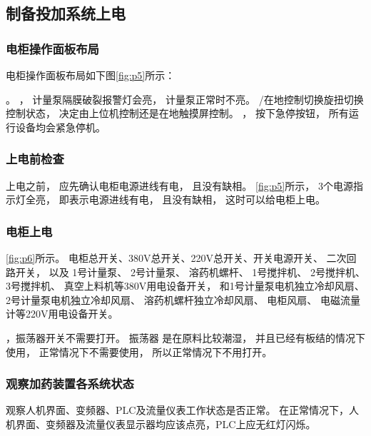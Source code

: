 \newpage %

   \subsection{制备投加系统上电}
        \subsubsection{电柜操作面板布局}
        电柜操作面板布局如下图\ref*{fig:p5}所示：

        

        。
        ，
        计量泵隔膜破裂报警灯会亮，
        计量泵正常时不亮。
        /在地控制切换旋扭切换控制状态，
        决定由上位机控制还是在地触摸屏控制。
        ，
        按下急停按钮，
        所有运行设备均会紧急停机。

      \subsubsection{上电前检查}
         上电之前，
         应先确认电柜电源进线有电，
         且没有缺相。
      \ref{fig:p5}所示，
      3个电源指示灯全亮，
      即表示电源进线有电，
      且没有缺相，
      这时可以给电柜上电。

      \newpage %

      \subsubsection{电柜上电}\label{sec:power-on}
        

      \ref{fig:p6}所示。
      电柜总开关、380V总开关、220V总开关、开关电源开关、
      二次回路开关，
      以及
      1号计量泵、
      2号计量泵、
      溶药机螺杆、
      1号搅拌机、
      2号搅拌机、
      3号搅拌机、
      真空上料机等380V用电设备开关，
      和1号计量泵电机独立冷却风扇、
      2号计量泵电机独立冷却风扇、
      溶药机螺杆独立冷却风扇、
      电柜风扇、
      电磁流量计等220V用电设备开关。

      ，振荡器开关不需要打开。
      振荡器 是在原料比较潮湿，
      并且已经有板结的情况下使用，
      正常情况下不需要使用，
      所以正常情况下不用打开。

      \subsubsection{观察加药装置各系统状态}
      观察人机界面、变频器、PLC及流量仪表工作状态是否正常。
      在正常情况下，人机界面、变频器及流量仪表显示器均应该点亮，PLC上应无红灯闪烁。

